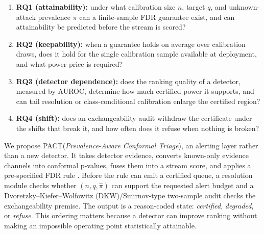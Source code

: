 \documentclass[a4paper,fleqn]{cas-dc}
\newcommand{\PACT}{PACT\xspace}
\begin{document}
\begin{enumerate}
  \item \textbf{RQ1 (attainability):} under what calibration size $n$, target $q$, and unknown-attack prevalence $\pi$ can a finite-sample FDR guarantee exist, and can attainability be predicted before the stream is scored?
  \item \textbf{RQ2 (keepability):} when a guarantee holds on average over calibration draws, does it hold for the single calibration sample available at deployment, and what power price is required?
  \item \textbf{RQ3 (detector dependence):} does the ranking quality of a detector, measured by AUROC, determine how much certified power it supports, and can tail resolution or class-conditional calibration enlarge the certified region?
  \item \textbf{RQ4 (shift):} does an exchangeability audit withdraw the certificate under the shifts that break it, and how often does it refuse when nothing is broken?
\end{enumerate}

We propose \PACT (\emph{Prevalence-Aware Conformal Triage}), an alerting layer rather than a new detector. It takes detector evidence, converts known-only evidence channels into conformal p-values, fuses them into a stream score, and applies a pre-specified FDR rule \cite{bates2023outliers}. Before the rule can emit a certified queue, a resolution module checks whether $(n,q,\hat\pi)$ can support the requested alert budget and a Dvoretzky--Kiefer--Wolfowitz (DKW)/Smirnov-type two-sample audit checks the exchangeability premise. The output is a reason-coded state: \emph{certified}, \emph{degraded}, or \emph{refuse}. This ordering matters because a detector can improve ranking without making an impossible operating point statistically attainable.
\end{document}
